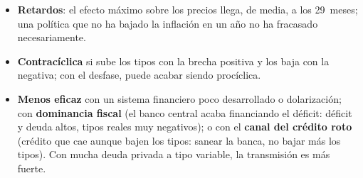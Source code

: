 \documentclass{article}
\begin{document}
\begin{columnas}
\begin{itemize}[itemsep=1.5pt]
\item \textbf{Retardos}: el efecto máximo sobre los precios llega, de media, a los 29~meses; una política que no ha bajado la inflación en un año no ha fracasado necesariamente.
\item \textbf{Contracíclica} si sube los tipos con la brecha positiva y los baja con la negativa; con el desfase, puede acabar siendo procíclica.
\item \textbf{Menos eficaz} con un sistema financiero poco desarrollado o dolarización; con \textbf{dominancia fiscal} (el banco central acaba financiando el déficit: déficit y deuda altos, tipos reales muy negativos); o con el \textbf{canal del crédito roto} (crédito que cae aunque bajen los tipos: sanear la banca, no bajar más los tipos). Con mucha deuda privada a tipo variable, la transmisión es más fuerte.
\end{itemize}


\end{columnas}
\end{document}
